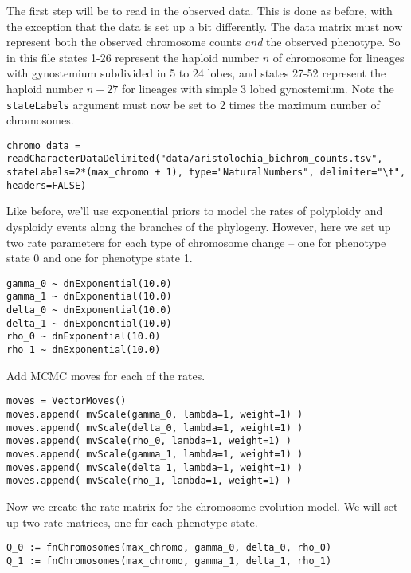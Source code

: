 The first step will be to read in the observed data. 
This is done as before, with the exception that the data is set up a bit differently. 
The data matrix must now represent both the observed chromosome counts \textit{and} the observed phenotype. 
So in this file states 1-26 represent the haploid number $n$ of chromosome for lineages 
with gynostemium subdivided in 5 to 24 lobes, and states 27-52 represent the haploid number $n + 27$
for lineages with simple 3 lobed gynostemium.
Note the \texttt{stateLabels} argument must now be set to 2 times the maximum number of chromosomes.
{\tt \begin{snugshade*}
\begin{lstlisting}
chromo_data = readCharacterDataDelimited("data/aristolochia_bichrom_counts.tsv", stateLabels=2*(max_chromo + 1), type="NaturalNumbers", delimiter="\t", headers=FALSE)
\end{lstlisting}
\end{snugshade*}}
Like before, we'll use exponential priors to model the rates of polyploidy and 
dysploidy events along the branches of the phylogeny.
However, here we set up two rate parameters for each type of chromosome change --
one for phenotype state 0 and one for phenotype state 1.
{\tt \begin{snugshade*}
\begin{lstlisting}
gamma_0 ~ dnExponential(10.0)
gamma_1 ~ dnExponential(10.0)
delta_0 ~ dnExponential(10.0)
delta_1 ~ dnExponential(10.0)
rho_0 ~ dnExponential(10.0)
rho_1 ~ dnExponential(10.0)
\end{lstlisting}
\end{snugshade*}}
Add MCMC moves for each of the rates.
{\tt \begin{snugshade*}
\begin{lstlisting}
moves = VectorMoves()
moves.append( mvScale(gamma_0, lambda=1, weight=1) )
moves.append( mvScale(delta_0, lambda=1, weight=1) )
moves.append( mvScale(rho_0, lambda=1, weight=1) )
moves.append( mvScale(gamma_1, lambda=1, weight=1) )
moves.append( mvScale(delta_1, lambda=1, weight=1) )
moves.append( mvScale(rho_1, lambda=1, weight=1) )
\end{lstlisting}
\end{snugshade*}}
Now we create the rate matrix for the chromosome evolution model.
We will set up two rate matrices, one for each phenotype state.
{\tt \begin{snugshade*}
\begin{lstlisting}
Q_0 := fnChromosomes(max_chromo, gamma_0, delta_0, rho_0)
Q_1 := fnChromosomes(max_chromo, gamma_1, delta_1, rho_1)
\end{lstlisting}
\end{snugshade*}}
